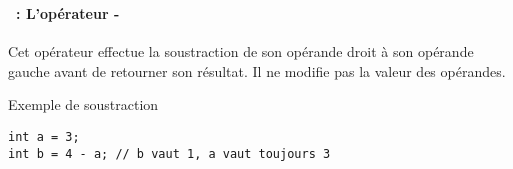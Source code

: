 \begin{frame}[containsverbatim]
  \frametitle{\secname}
  \framesubtitle{\subsecname~: L'opérateur -} 

  Cet opérateur effectue la soustraction de son opérande droit à son opérande gauche avant de retourner son résultat. Il ne modifie pas la valeur
  des opérandes.
  \vspace{0.5cm}
  \begin{exampleblock}{Exemple de soustraction}
    \begin{verbatim}
int a = 3;
int b = 4 - a; // b vaut 1, a vaut toujours 3\end{verbatim}
  \end{exampleblock}
\end{frame}

